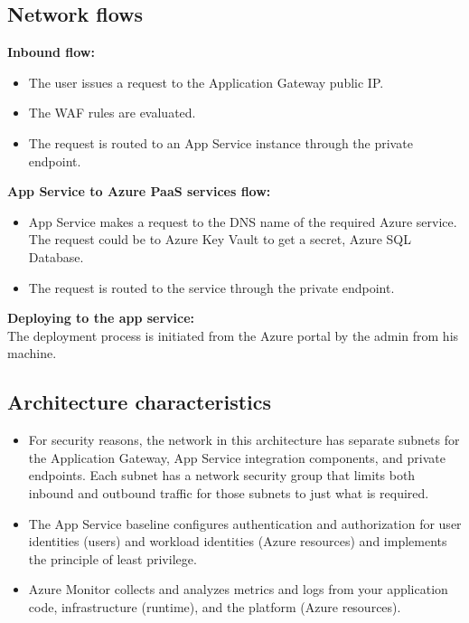 \subsection{Network flows}
\textbf{Inbound flow:}
\begin{itemize}
    \item The user issues a request to the Application Gateway public IP.
    \item The WAF rules are evaluated.
    \item The request is routed to an App Service instance through the private endpoint.
\end{itemize}
\textbf{App Service to Azure PaaS services flow:}
\begin{itemize}
    \item App Service makes a request to the DNS name of the required Azure service. The request could be to Azure Key Vault to get a secret, Azure SQL Database.
    \item The request is routed to the service through the private endpoint.
\end{itemize}

\textbf{Deploying to the app service:} \\
The deployment process is initiated from the Azure portal by the admin from his machine.

\subsection{Architecture characteristics}
\begin{itemize}
    \item For security reasons, the network in this architecture has separate subnets for the Application Gateway, App Service integration components, and private endpoints. Each subnet has a network security group that limits both inbound and outbound traffic for those subnets to just what is required.
    \item The App Service baseline configures authentication and authorization for user identities (users) and workload identities (Azure resources) and implements the principle of least privilege.
    \item Azure Monitor collects and analyzes metrics and logs from your application code, infrastructure (runtime), and the platform (Azure resources).
\end{itemize}
